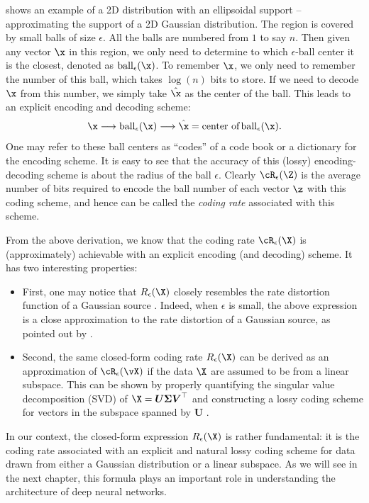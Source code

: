 \documentclass[../../book-main.tex]{subfiles}
\begin{document}
\begin{example}
	 shows an example of a 2D distribution with an ellipsoidal support -- approximating the support of a 2D Gaussian distribution. The region is covered by small balls of size $\epsilon$. All the balls are numbered from $1$ to say $n$. Then given any vector $\x$ in this region, we
	only need to determine to which $\epsilon$-ball center it is the closest, denoted as $\operatorname{ball}_{\epsilon}(\x)$. To remember $\x$, we only need to remember the number of this ball, which takes $\log(n)$ bits to store. If we need to decode $\x$ from this number, we simply take $\hat \x$ as the center of the ball. This leads to an explicit encoding and decoding scheme:
	\begin{equation}
		\x \longrightarrow \operatorname{ball}_{\epsilon}(\x) \longrightarrow \hat \x = \mbox{center of} \operatorname{ball}_{\epsilon}(\x).
	\end{equation}
	One may refer to these ball centers as  ``codes'' of a code book or a dictionary for the encoding scheme. It is easy to see that the accuracy of this (lossy) encoding-decoding scheme is about the radius of the ball $\epsilon$. 
	Clearly $\cR_{\epsilon}(\Z)$ is the average
	number of bits required to encode the ball number of each vector $\z$ with
	this coding scheme, and hence can be called the {\em coding rate} associated with this scheme.
\end{example}


From the above derivation, we know that the coding rate $\cR_{\epsilon}(\X)$ is (approximately) achievable with an explicit encoding (and decoding) scheme. It has two interesting  properties:
\begin{itemize}
	\item First, one may notice that $R_{\epsilon}(\X)$ closely resembles the rate distortion function of a Gaussian source \cite{Cover-Thomas}. Indeed, when $\epsilon$ is small, the above expression is a close approximation to the rate distortion of a Gaussian source, as pointed out by   \cite{MaY2007-PAMI}.
	\item Second, the same closed-form coding rate $R_{\epsilon}(\X)$ can be derived as an approximation of \(\cR_{\epsilon}(\vX)\) if the data $\X$ are assumed to be from a linear subspace. This can be shown by properly quantifying the singular value decomposition (SVD) of $\X = \boldsymbol{U} \boldsymbol{\Sigma}\boldsymbol{V}^\top$ and constructing a lossy coding scheme for vectors in the subspace spanned by $\boldsymbol{U}$ \cite{MaY2007-PAMI}.
\end{itemize}
In our context, the closed-form expression $R_{\epsilon}(\X)$ is rather fundamental: it is the coding rate associated with an explicit and natural lossy coding scheme for data drawn from either a Gaussian distribution or a linear subspace. As we will see in the next chapter, this formula plays an important role in understanding the architecture of deep neural networks.
\end{document}
